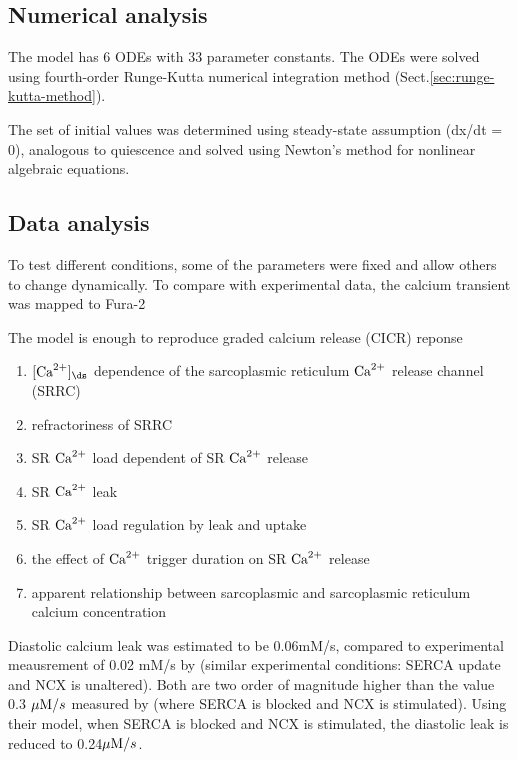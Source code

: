 \subsection{Numerical analysis}

The model has 6 ODEs with 33 parameter constants. The ODEs were solved using
fourth-order Runge-Kutta numerical integration method
(Sect.\ref{sec:runge-kutta-method}).

The set of initial values was determined using steady-state assumption (dx/dt =
0), analogous to quiescence and solved using Newton's method for nonlinear
algebraic equations.

\subsection{Data analysis}

To test different conditions, some of the parameters were fixed and allow others
to change dynamically. To compare with experimental data, the calcium transient
was mapped to Fura-2

The model is enough to reproduce graded calcium release (CICR) reponse
\begin{enumerate}
  \item $[\Ca]_\ds$ dependence of the sarcoplasmic reticulum ${\text{Ca}^{2+}}$ release
  channel (SRRC) \citep{fabiato1985scc}
  \item refractoriness of SRRC \citep{cheng1996csc}
  \item SR ${\text{Ca}^{2+}}$ load dependent of SR ${\text{Ca}^{2+}}$ release \citep{bassani1995fsr, gilchrist1992icd}
  \item SR ${\text{Ca}^{2+}}$ leak \citep{wier1994lce, bassani1995rdc}
  \item SR ${\text{Ca}^{2+}}$ load regulation by leak and uptake \citep{ginsburg1998}
  \item the effect of ${\text{Ca}^{2+}}$ trigger duration on SR ${\text{Ca}^{2+}}$ release
  \citep{Bers1990}
  \item apparent relationship between sarcoplasmic and sarcoplasmic reticulum
  calcium concentration \citep{shannon1997}
\end{enumerate}

Diastolic calcium leak was estimated to be 0.06mM/s, compared to experimental
meausrement of 0.02 mM/s by \citep{wier1994lce} (similar experimental
conditions: SERCA update and NCX is unaltered). Both are two order of magnitude
higher than the value 0.3 ${\mu\text{M}}/s$ measured by \citep{bassani1995a} (where SERCA
is blocked and NCX is stimulated). Using their model, when SERCA is blocked and
NCX is stimulated, the diastolic leak is reduced to 0.24${\mu\text{M}}/s$.


